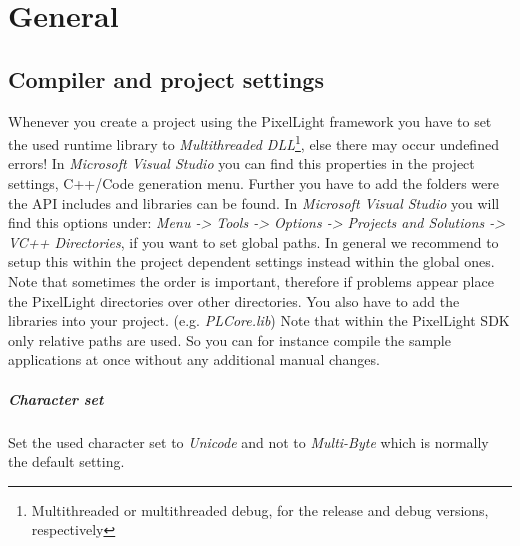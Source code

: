 \chapter{General}




\section{Compiler and project settings}
Whenever you create a project using the PixelLight framework you have to set the used runtime library to \emph{Multithreaded DLL}\footnote{Multithreaded or multithreaded debug, for the release and debug versions, respectively}, else there may occur undefined errors! In \emph{Microsoft Visual Studio} you can find this properties in the project settings, C++/Code generation menu. Further you have to add the folders were the API includes and libraries can be found. In \emph{Microsoft Visual Studio} you will find this options under: \emph{Menu -> Tools -> Options -> Projects and Solutions -> VC++ Directories}, if you want to set global paths. In general we recommend to setup this within the project dependent settings instead within the global ones. Note that sometimes the order is important, therefore if problems appear place the PixelLight directories over other directories. You also have to add the libraries into your project. (e.g. \emph{PLCore.lib}) Note that within the PixelLight SDK only relative paths are used. So you can for instance compile the sample applications at once without any additional manual changes.


\paragraph{Character set}
Set the used character set to \emph{Unicode} and not to \emph{Multi-Byte} which is normally the default setting.


